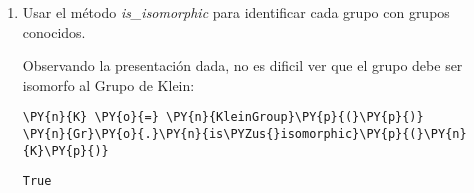 \begin{enumerate}
 \begin{tcolorbox}[breakable, size=fbox, boxrule=.5pt, pad at break*=1mm, opacityfill=0]
    \begin{Verbatim}[commandchars=\\\{\}]
g0 = (1, 2)(3, 4)
g1 = (1, 3)(2, 4)
    \end{Verbatim}
\end{tcolorbox}
    

En este momento, tenemos los generadores que definen al grupo. En particular, en este ejemplo el grupo estará definido por
$G = \langle \, g0, \, g1 \, \rangle $.


\begin{tcolorbox}[breakable, size=fbox, boxrule=1pt, pad at break*=1mm,colback=cellbackground, colframe=cellborder]
\begin{Verbatim}[commandchars=\\\{\}]
\PY{n}{Gr} \PY{o}{=} \PY{n}{Group(elems=generators)}
\end{Verbatim}
\end{tcolorbox}  
 
 
\item  Usar el método \textit{is\_isomorphic} para identificar cada grupo con
  grupos conocidos.
  
  
Observando la presentación dada, no es dificil ver que el grupo debe ser isomorfo al Grupo de Klein:

\begin{tcolorbox}[breakable, size=fbox, boxrule=1pt, pad at break*=1mm,colback=cellbackground, colframe=cellborder]
\begin{Verbatim}[commandchars=\\\{\}]
\PY{n}{K} \PY{o}{=} \PY{n}{KleinGroup}\PY{p}{(}\PY{p}{)}
\PY{n}{Gr}\PY{o}{.}\PY{n}{is\PYZus{}isomorphic}\PY{p}{(}\PY{n}{K}\PY{p}{)}
\end{Verbatim}
\end{tcolorbox}

\begin{tcolorbox}[breakable, size=fbox, boxrule=.5pt, pad at break*=1mm, opacityfill=0]
\begin{Verbatim}[commandchars=\\\{\}]
True
\end{Verbatim}
\end{tcolorbox}
  
  
\end{enumerate}


